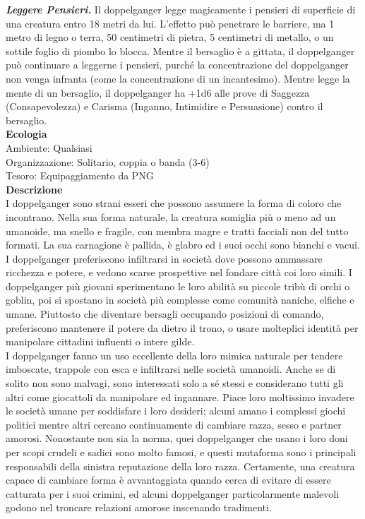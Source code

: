\begin{multicols}{2}
\emph{\textbf{Leggere Pensieri.}} Il doppelganger legge magicamente i pensieri di superficie di una creatura entro 18 metri da lui. L'effetto può penetrare le barriere, ma 1 metro di legno o terra, 50 centimetri di pietra, 5 centimetri di metallo, o un sottile foglio di piombo lo blocca. Mentre il bersaglio è a gittata, il doppelganger può continuare a leggerne i pensieri, purché la concentrazione del doppelganger non venga infranta (come la concentrazione di un incantesimo). Mentre legge la mente di un bersaglio, il doppelganger ha +1d6 alle prove di Saggezza (Consapevolezza) e Carisma (Inganno, Intimidire e Persuasione) contro il bersaglio.\\
\textbf{Ecologia}\\
Ambiente: Qualsiasi\\
Organizzazione: Solitario, coppia o banda (3-6)\\
Tesoro: Equipaggiamento da PNG\\
\textbf{Descrizione}\\
I doppelganger sono strani esseri che possono assumere la forma di coloro che incontrano. Nella sua forma naturale, la creatura somiglia più o meno ad un umanoide, ma snello e fragile, con membra magre e tratti facciali non del tutto formati. La sua carnagione è pallida, è glabro ed i suoi occhi sono bianchi e vacui.\\
I doppelganger preferiscono infiltrarsi in società dove possono ammassare ricchezza e potere, e vedono scarse prospettive nel fondare città coi loro simili. I doppelganger più giovani sperimentano le loro abilità su piccole tribù di orchi o goblin, poi si spostano in società più complesse come comunità naniche, elfiche e umane. Piuttosto che diventare bersagli occupando posizioni di comando, preferiscono mantenere il potere da dietro il trono, o usare molteplici identità per manipolare cittadini influenti o intere gilde.\\
I doppelganger fanno un uso eccellente della loro mimica naturale per tendere imboscate, trappole con esca e infiltrarsi nelle società umanoidi. Anche se di solito non sono malvagi, sono interessati solo a sé stessi e considerano tutti gli altri come giocattoli da manipolare ed ingannare. Piace loro moltissimo invadere le società umane per soddisfare i loro desideri; alcuni amano i complessi giochi politici mentre altri cercano continuamente di cambiare razza, sesso e partner amorosi. Nonostante non sia la norma, quei doppelganger che usano i loro doni per scopi crudeli e sadici sono molto famosi, e questi mutaforma sono i principali responsabili della sinistra reputazione della loro razza. Certamente, una creatura capace di cambiare forma è avvantaggiata quando cerca di evitare di essere catturata per i suoi crimini, ed alcuni doppelganger particolarmente malevoli godono nel troncare relazioni amorose inscenando tradimenti.\\


\end{multicols}
